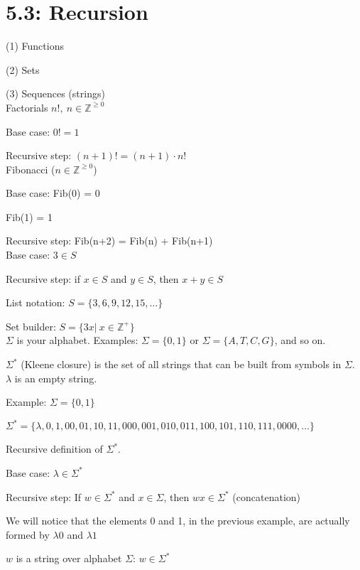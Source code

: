\documentclass{exam}
\begin{document}
	
    \section{5.3: Recursion}
    
    (1) Functions
    
    (2) Sets
    
    (3) Sequences (strings)\\
    
    Factorials $n!,\ n \in \mathbb Z^{\geq 0}$
    
    Base case: $0! = 1$
    
    Recursive step: $(n+1)! = (n+1) \cdot n!$\\
    
    Fibonacci ($n \in \mathbb Z^{\geq 0}$)
    
    Base case: Fib(0) = 0
    
    Fib(1) = 1
    
    Recursive step: Fib(n+2) = Fib(n) + Fib(n+1)\\
    
    Base case: $3 \in S$
    
    Recursive step:  
    \qquad if $x \in S$ and $y \in S$, then $x+y \in S$
    
    List notation: $S =\{3, 6, 9, 12, 15, \dots\} $
    
    Set builder: $S = \{3x |\ x \in \mathbb Z^+\}$\\
    
    $\Sigma$ is your alphabet. Examples: $\Sigma = \{0,1\}$  or $\Sigma = \{A,T,C,G\}$, and so on.
    
    $\Sigma^*$ (Kleene closure) is the set of all strings that can be built from symbols in $\Sigma$. $\lambda$ is an empty string.
    
    Example: $\Sigma = \{0,1\}$
    
    $\Sigma^* = \{\lambda, 0, 1, 00, 01, 10, 11, 000, 001, 010, 011, 100, 101, 110, 111, 0000, \dots \}$
    
    Recursive definition of $\Sigma^*$.
    
    Base case: $\lambda \in \Sigma^*$
    
    Recursive step: If $w \in \Sigma^*$ and $x \in \Sigma$, then $wx \in \Sigma^*$ (concatenation)
    
    We will notice that the elements 0 and 1, in the previous example, are actually formed by $\lambda0$ and $\lambda1$
    
    $w$ is a string over alphabet $\Sigma$: $w \in \Sigma^*$
    
\end{document}
